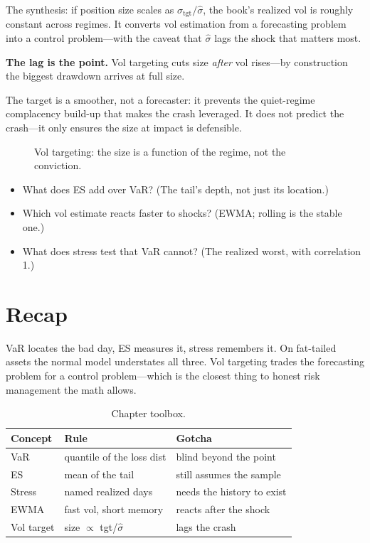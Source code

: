 The synthesis: if position size scales as $\sigma_{\text{tgt}}/\hat\sigma$, the book's
realized vol is roughly constant across regimes. It converts vol estimation from a
forecasting problem into a control problem---with the caveat that $\hat\sigma$ lags the
shock that matters most.

\begin{example}\label{ex:voltgt}
\textbf{The lag is the point.} Vol targeting cuts size \emph{after} vol rises---by
construction the biggest drawdown arrives at full size.
\begin{solution}
The target is a smoother, not a forecaster: it prevents the quiet-regime complacency
build-up that makes the crash leveraged. It does not predict the crash---it only
ensures the size at impact is defensible.
\end{solution}
\end{example}

\begin{figure}[htbp]\centering

\caption{Vol targeting: the size is a function of the regime, not the conviction.}
\label{fig:voltgt}
\end{figure}

\begin{checkpoint}
\begin{itemize}
\item What does ES add over VaR? (The tail's depth, not just its location.)
\item Which vol estimate reacts faster to shocks? (EWMA; rolling is the stable one.)
\item What does stress test that VaR cannot? (The realized worst, with correlation 1.)
\end{itemize}
\end{checkpoint}

\section{Recap}\label{sec:riskrecap}

VaR locates the bad day, ES measures it, stress remembers it. On fat-tailed assets the
normal model understates all three. Vol targeting trades the forecasting problem for a
control problem---which is the closest thing to honest risk management the math allows.

\begin{table}[htbp]\centering\small
\caption{Chapter toolbox.}
\begin{tabular}{@{}lll@{}}
\toprule
Concept & Rule & Gotcha\\
\midrule
VaR & quantile of the loss dist & blind beyond the point\\
ES & mean of the tail & still assumes the sample\\
Stress & named realized days & needs the history to exist\\
EWMA & fast vol, short memory & reacts after the shock\\
Vol target & size $\propto$ tgt/$\hat\sigma$ & lags the crash\\
\bottomrule
\end{tabular}
\end{table}

